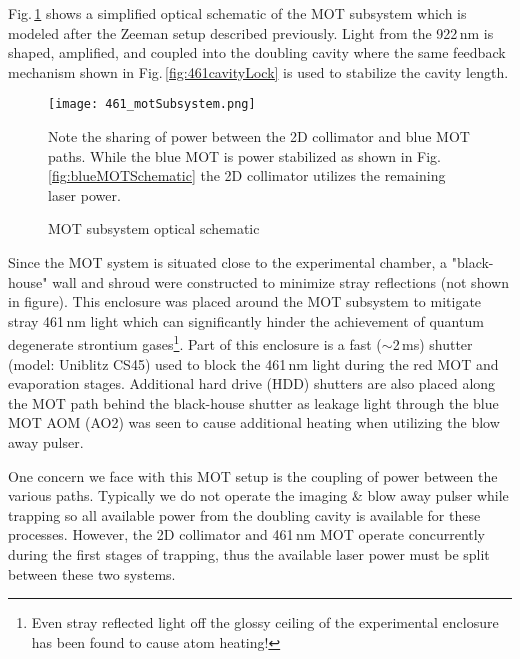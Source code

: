 Fig.\,\ref{fig:motSchematic} shows a simplified optical schematic of the MOT subsystem which is modeled after the Zeeman setup described previously.
Light from the 922\,nm is shaped, amplified, and coupled into the doubling cavity where the same feedback mechanism shown in Fig.\,\ref{fig:461cavityLock} is used to stabilize the cavity length.
	\begin{figure} 
		\centerline{
		\texttt{[image: 461\_motSubsystem.png]}}
		\caption{MOT subsystem optical schematic}{Note the sharing of power between the 2D collimator and blue MOT paths. While the blue MOT is power stabilized as shown in Fig.\,\ref{fig:blueMOTSchematic} the 2D collimator utilizes the remaining laser power.}
		\label{fig:motSchematic}
	\end{figure}
Since the MOT system is situated close to the experimental chamber, a "black-house" wall and shroud were constructed to minimize stray reflections (not shown in figure).
This enclosure was placed around the MOT subsystem to mitigate stray 461\,nm light which can significantly hinder the achievement of quantum degenerate strontium gases\footnote{Even stray reflected light off the glossy ceiling of the experimental enclosure has been found to cause atom heating!}.
Part of this enclosure is a fast ($\sim$2\,ms) shutter (model: Uniblitz CS45) used to block the 461\,nm light during the red MOT and evaporation stages.
Additional hard drive (HDD) shutters are also placed along the MOT path behind the black-house shutter as leakage light through the blue MOT AOM (AO2) was seen to cause additional heating when utilizing the blow away pulser.

One concern we face with this MOT setup is the coupling of power between the various paths.
Typically we do not operate the imaging \& blow away pulser while trapping so all available power from the doubling cavity is available for these processes.
However, the 2D collimator and 461\,nm MOT operate concurrently during the first stages of trapping, thus the available laser power must be split between these two systems. 


